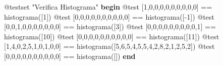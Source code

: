\documentclass[
  letterpaper,
  DIV=11,
  numbers=noendperiod]{scrreprt}
\newenvironment{Shaded}{\begin{snugshade}}{\end{snugshade}}
\newcommand{\ControlFlowTok}[1]{\textcolor[rgb]{0.00,0.23,0.31}{\textbf{#1}}}
\newcommand{\FloatTok}[1]{\textcolor[rgb]{0.68,0.00,0.00}{#1}}
\newcommand{\FunctionTok}[1]{\textcolor[rgb]{0.28,0.35,0.67}{#1}}
\newcommand{\NormalTok}[1]{\textcolor[rgb]{0.00,0.23,0.31}{#1}}
\newcommand{\OperatorTok}[1]{\textcolor[rgb]{0.37,0.37,0.37}{#1}}
\newcommand{\PreprocessorTok}[1]{\textcolor[rgb]{0.68,0.00,0.00}{#1}}
\newcommand{\StringTok}[1]{\textcolor[rgb]{0.13,0.47,0.30}{#1}}
\begin{document}
\begin{Shaded}
\begin{Highlighting}[]
\PreprocessorTok{@testset} \StringTok{"Verifica Histograma"} \ControlFlowTok{begin}
    \PreprocessorTok{@test}\NormalTok{ [}\FloatTok{1}\NormalTok{,}\FloatTok{0}\NormalTok{,}\FloatTok{0}\NormalTok{,}\FloatTok{0}\NormalTok{,}\FloatTok{0}\NormalTok{,}\FloatTok{0}\NormalTok{,}\FloatTok{0}\NormalTok{,}\FloatTok{0}\NormalTok{,}\FloatTok{0}\NormalTok{,}\FloatTok{0}\NormalTok{] }\OperatorTok{==} \FunctionTok{histograma}\NormalTok{([}\FloatTok{1}\NormalTok{])}
    \PreprocessorTok{@test}\NormalTok{ [}\FloatTok{0}\NormalTok{,}\FloatTok{0}\NormalTok{,}\FloatTok{0}\NormalTok{,}\FloatTok{0}\NormalTok{,}\FloatTok{0}\NormalTok{,}\FloatTok{0}\NormalTok{,}\FloatTok{0}\NormalTok{,}\FloatTok{0}\NormalTok{,}\FloatTok{0}\NormalTok{,}\FloatTok{0}\NormalTok{] }\OperatorTok{==} \FunctionTok{histograma}\NormalTok{([}\OperatorTok{{-}}\FloatTok{1}\NormalTok{])}
    \PreprocessorTok{@test}\NormalTok{ [}\FloatTok{0}\NormalTok{,}\FloatTok{0}\NormalTok{,}\FloatTok{1}\NormalTok{,}\FloatTok{0}\NormalTok{,}\FloatTok{0}\NormalTok{,}\FloatTok{0}\NormalTok{,}\FloatTok{0}\NormalTok{,}\FloatTok{0}\NormalTok{,}\FloatTok{0}\NormalTok{,}\FloatTok{0}\NormalTok{] }\OperatorTok{==} \FunctionTok{histograma}\NormalTok{([}\FloatTok{3}\NormalTok{])}
    \PreprocessorTok{@test}\NormalTok{ [}\FloatTok{0}\NormalTok{,}\FloatTok{0}\NormalTok{,}\FloatTok{0}\NormalTok{,}\FloatTok{0}\NormalTok{,}\FloatTok{0}\NormalTok{,}\FloatTok{0}\NormalTok{,}\FloatTok{0}\NormalTok{,}\FloatTok{0}\NormalTok{,}\FloatTok{0}\NormalTok{,}\FloatTok{1}\NormalTok{] }\OperatorTok{==} \FunctionTok{histograma}\NormalTok{([}\FloatTok{10}\NormalTok{])}
    \PreprocessorTok{@test}\NormalTok{ [}\FloatTok{0}\NormalTok{,}\FloatTok{0}\NormalTok{,}\FloatTok{0}\NormalTok{,}\FloatTok{0}\NormalTok{,}\FloatTok{0}\NormalTok{,}\FloatTok{0}\NormalTok{,}\FloatTok{0}\NormalTok{,}\FloatTok{0}\NormalTok{,}\FloatTok{0}\NormalTok{,}\FloatTok{0}\NormalTok{] }\OperatorTok{==} \FunctionTok{histograma}\NormalTok{([}\FloatTok{11}\NormalTok{])}
    \PreprocessorTok{@test}\NormalTok{ [}\FloatTok{1}\NormalTok{,}\FloatTok{4}\NormalTok{,}\FloatTok{0}\NormalTok{,}\FloatTok{2}\NormalTok{,}\FloatTok{5}\NormalTok{,}\FloatTok{1}\NormalTok{,}\FloatTok{0}\NormalTok{,}\FloatTok{1}\NormalTok{,}\FloatTok{0}\NormalTok{,}\FloatTok{0}\NormalTok{] }\OperatorTok{==} \FunctionTok{histograma}\NormalTok{([}\FloatTok{5}\NormalTok{,}\FloatTok{6}\NormalTok{,}\FloatTok{5}\NormalTok{,}\FloatTok{4}\NormalTok{,}\FloatTok{5}\NormalTok{,}\FloatTok{5}\NormalTok{,}\FloatTok{4}\NormalTok{,}\FloatTok{2}\NormalTok{,}\FloatTok{8}\NormalTok{,}\FloatTok{2}\NormalTok{,}\FloatTok{1}\NormalTok{,}\FloatTok{2}\NormalTok{,}\FloatTok{5}\NormalTok{,}\FloatTok{2}\NormalTok{])}
    \PreprocessorTok{@test}\NormalTok{ [}\FloatTok{0}\NormalTok{,}\FloatTok{0}\NormalTok{,}\FloatTok{0}\NormalTok{,}\FloatTok{0}\NormalTok{,}\FloatTok{0}\NormalTok{,}\FloatTok{0}\NormalTok{,}\FloatTok{0}\NormalTok{,}\FloatTok{0}\NormalTok{,}\FloatTok{0}\NormalTok{,}\FloatTok{0}\NormalTok{] }\OperatorTok{==} \FunctionTok{histograma}\NormalTok{([])}
    \ControlFlowTok{end}
\end{Highlighting}
\end{Shaded}
\end{document}
